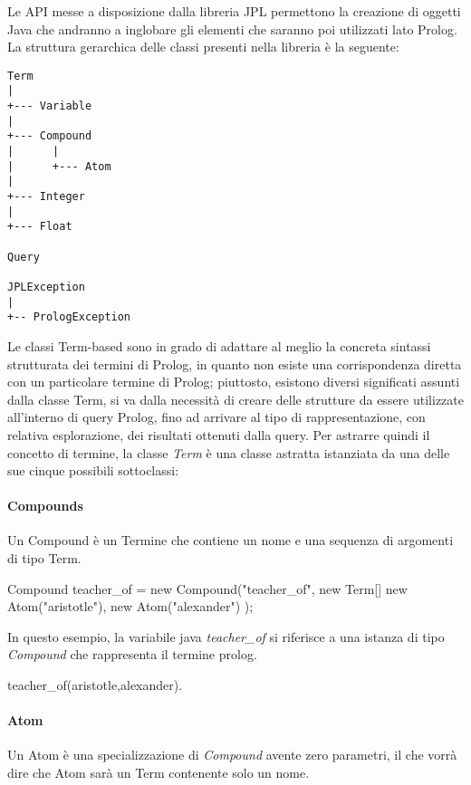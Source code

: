 Le API messe a disposizione dalla libreria JPL permettono la creazione di oggetti Java che andranno a inglobare gli elementi che saranno poi utilizzati lato Prolog. La struttura gerarchica delle classi presenti nella libreria è la seguente:
\begin{Verbatim}
Term
|
+--- Variable
|
+--- Compound
|      |
|      +--- Atom
|
+--- Integer
|
+--- Float

Query

JPLException
|
+-- PrologException
\end{Verbatim}

Le classi Term-based sono in grado di adattare al meglio la concreta sintassi strutturata dei termini di Prolog, in quanto non esiste una corrispondenza diretta con un particolare termine di Prolog; piuttosto, esistono diversi significati assunti dalla classe Term, si va dalla necessità di creare delle strutture da essere utilizzate all'interno di query Prolog, fino ad arrivare al tipo di rappresentazione, con relativa esplorazione, dei risultati ottenuti dalla query.
Per astrarre quindi il concetto di termine, la classe \emph{Term} è una classe astratta istanziata da una delle sue cinque possibili sottoclassi:
\paragraph{Compounds}
Un Compound è un Termine che contiene un nome e una sequenza di argomenti di tipo Term.

\begin{javacode}
Compound teacher_of = new Compound("teacher_of",
                  new Term[] {
                        new Atom("aristotle"),
                        new Atom("alexander")
                        }
                );
\end{javacode}

In questo esempio, la variabile java \emph{teacher\_of} si riferisce a una istanza di tipo \emph{Compound} che rappresenta il termine prolog.

\begin{prologcode}
  teacher_of(aristotle,alexander).
\end{prologcode}

\paragraph{Atom}
Un Atom è una specializzazione di \emph{Compound} avente zero parametri, il che vorrà dire che Atom sarà un Term contenente solo un nome.

